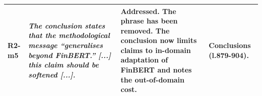 \documentclass[10pt]{article}
\begin{document}
\begin{longtable}{>{\raggedright\arraybackslash}p{1.1cm}>{\raggedright\arraybackslash}p{8.2cm}>{\raggedright\arraybackslash}p{9.0cm}>{\raggedright\arraybackslash}p{6.0cm}}
\textbf{R2-m5} & \emph{The conclusion states that the methodological message ``generalises beyond FinBERT.'' [...] this claim should be softened [...].} & \textbf{Addressed.} The phrase has been removed. The conclusion now limits claims to in-domain adaptation of FinBERT and notes the out-of-domain cost. & Conclusions (l.879-904). \\ \midrule
\bottomrule
\end{longtable}
\end{document}
